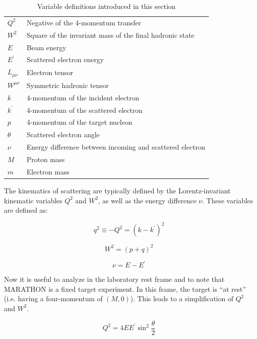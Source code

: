 \begin{table}
\center
\begin{tabular}{|l|l|}
\hline 
$Q^2$ & Negative of the 4-momentum transfer \\
$W^2$ & Square of the invariant mass of the final hadronic state \\
$E$ & Beam energy \\
$E^\prime$ & Scattered electron energy \\
$L_{\mu\nu}$ & Electron tensor \\
$W^{\mu\nu}$ & Symmetric hadronic tensor \\
$k$ & 4-momentum of the incident electron \\
$k^\prime$ & 4-momentum of the scattered electron \\
$p$ & 4-momentum of the target nucleon \\
$\theta$ & Scattered electron angle \\
$\nu$ & Energy difference between incoming and scattered electron \\
$M$ & Proton mass \\
$m$ & Electron mass \\
\hline
\end{tabular}
\caption{Variable definitions introduced in this section}
\label{tab:var_def}
\end{table}

The kinematics of scattering are typically defined by the Lorentz-invariant kinematic variables $Q^2$ and $W^2$, as well as the energy difference $\nu$. These variables are defined as:

\begin{equation}
	q^2 \equiv -Q^2 = \left(k-k^\prime\right)^2
\end{equation}

\begin{equation}
	W^2 = \left(p+q\right)^2
\end{equation}

\begin{equation}
	\nu = E-E^\prime
\end{equation}

Now it is useful to analyze in the laboratory rest frame and to note that MARATHON is a fixed target experiment. In this frame, the target is ``at rest'' (i.e. having a four-momentum of $\left(M,0\right)$). This leads to a simplification of $Q^2$ and $W^2$.

\begin{equation}
	Q^2 = 4EE^\prime\sin^2\frac{\theta}{2}
\end{equation}

